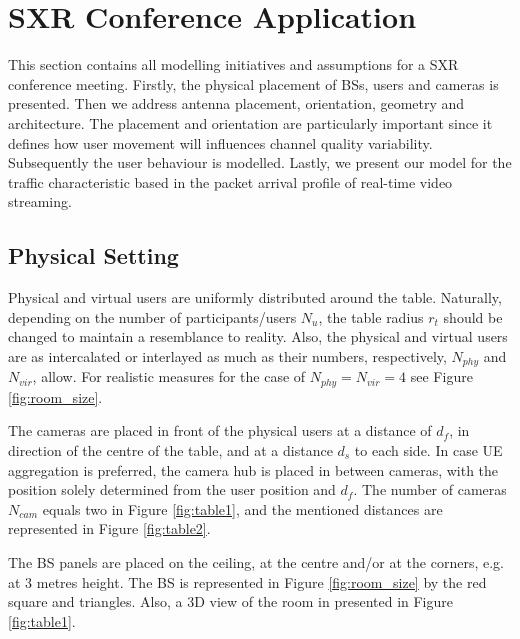 \section{SXR Conference Application}
\label{sec:sxr_meeting_modelling}

This section contains all modelling initiatives and assumptions for a SXR conference meeting. Firstly, the physical placement of \acp{BS}, users and cameras is presented. Then we address antenna placement, orientation, geometry and architecture. The placement and orientation are particularly important since it defines how user movement will influences channel quality variability. Subsequently the user behaviour is modelled. Lastly, we present our model for the traffic characteristic based in the packet arrival profile of real-time video streaming.

\subsection{Physical Setting}
\label{ue_placement}

Physical and virtual users are uniformly distributed around the table. Naturally, depending on the number of participants/users $N_{u}$, the table radius $r_{t}$ should be changed to maintain a resemblance to reality. Also, the physical and virtual users are as intercalated or interlayed as much as their numbers, respectively, $N_{phy}$ and $N_{vir}$, allow. For realistic measures for the case of $N_{phy} = N_{vir} = 4$ see Figure \ref{fig:room_size}.


The cameras are placed in front of the physical users at a distance of $d_f$, in direction of the centre of the table, and at a distance $d_s$ to each side. In case \ac{UE} aggregation is preferred, the camera hub is placed in between cameras, with the position solely determined from the user position and $d_f$. The number of cameras $N_{cam}$ equals two in Figure \ref{fig:table1}, and the mentioned distances are represented in Figure \ref{fig:table2}.

The \ac{BS} panels are placed on the ceiling, at the centre and/or at the corners, e.g. at 3 metres height. The BS is represented in Figure \ref{fig:room_size} by the red square and triangles. Also, a 3D view of the room in presented in Figure \ref{fig:table1}.


